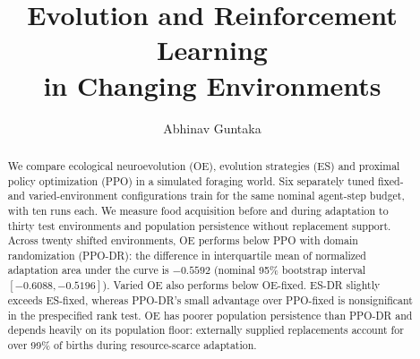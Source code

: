 \documentclass[11pt]{article}
\title{Evolution and Reinforcement Learning\\in Changing Environments}
\author{Abhinav Guntaka}
\date{}
\begin{document}
\maketitle
\vspace{-2em}
\begin{abstract}
We compare ecological neuroevolution (OE), evolution strategies (ES) and proximal policy optimization (PPO) in a simulated foraging world. Six separately tuned fixed- and varied-environment configurations train for the same nominal agent-step budget, with ten runs each. We measure food acquisition before and during adaptation to thirty test environments and population persistence without replacement support. Across twenty shifted environments, OE performs below PPO with domain randomization (PPO-DR): the difference in interquartile mean of normalized adaptation area under the curve is $-0.5592$ (nominal 95\% bootstrap interval $[-0.6088,-0.5196]$). Varied OE also performs below OE-fixed. ES-DR slightly exceeds ES-fixed, whereas PPO-DR's small advantage over PPO-fixed is nonsignificant in the prespecified rank test. OE has poorer population persistence than PPO-DR and depends heavily on its population floor: externally supplied replacements account for over 99\% of births during resource-scarce adaptation.
\end{abstract}






\clearpage
\appendix

\end{document}

